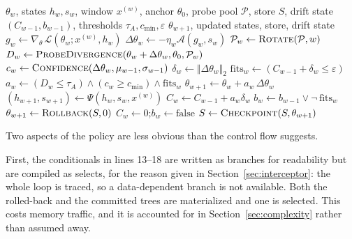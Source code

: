 \documentclass[journal]{IEEEtran}
\newcommand{\fast}{\theta}
\newcommand{\anchorp}{\theta_{0}}
\newcommand{\dtheta}{\Delta\theta}
\newcommand{\budget}{\varepsilon}
\begin{document}
\begin{algorithm}[!t]
\caption{Trust-gated fast-weight update (one window $w$)}
\label{alg:gate}
\begin{algorithmic}[1]
\Require $\fast_w$, states $h_w, s_w$, window $x^{(w)}$, anchor $\anchorp$, probe
         pool $\mathcal{P}$, store $S$, drift state $(C_{w-1}, b_{w-1})$,
         thresholds $\tau_A, c_{\min}, \budget$
\Ensure  $\fast_{w+1}$, updated states, store, drift state
\State $g_w \gets \nabla_{\fast}\,\mathcal{L}(\fast_w; x^{(w)}, h_w)$
       \Comment{\eqref{eq:innergrad}}
\State $\dtheta_w \gets -\eta_w \mathcal{A}(g_w, s_w)$ \Comment{\eqref{eq:delta}}
\State $\mathcal{P}_w \gets \Call{Rotate}{\mathcal{P}, w}$ \Comment{\eqref{eq:rotation}}
\State $D_w \gets \Call{ProbeDivergence}{\fast_w + \dtheta_w, \anchorp, \mathcal{P}_w}$
       \Comment{\eqref{eq:divergence}}
\State $c_w \gets \Call{Confidence}{\dtheta_w, \mu_{w-1}, \sigma_{w-1}}$
       \Comment{\eqref{eq:confidence}}
\State $\delta_w \gets \Vert \dtheta_w \Vert_2$ \Comment{\eqref{eq:driftdelta}}
\State $\mathrm{fits}_w \gets (C_{w-1} + \delta_w \leq \budget)$
       \Comment{\eqref{eq:wouldbreach}}
\State $a_w \gets (D_w \leq \tau_A) \wedge (c_w \geq c_{\min}) \wedge \mathrm{fits}_w$
       \Comment{\eqref{eq:admit}}
\State $\fast_{w+1} \gets \fast_w + a_w\,\dtheta_w$
\State $(h_{w+1}, s_{w+1}) \gets \Psi(h_w, s_w, x^{(w)})$
\State $C_w \gets C_{w-1} + a_w \delta_w$ \Comment{\eqref{eq:accumulate}}
\State $b_w \gets b_{w-1} \vee \neg\,\mathrm{fits}_w$ \Comment{\eqref{eq:latch}}
    \State $\fast_{w+1} \gets \Call{Rollback}{S, 0}$ \Comment{\eqref{eq:rollback}}
    \State $C_w \gets 0$;\quad $b_w \gets \text{false}$ 
    \State {}
    \State $S \gets \Call{Checkpoint}{S, \fast_{w+1}}$ 
\EndIf
\State {}
\end{algorithmic}
\end{algorithm}

Two aspects of the policy are less obvious than the control flow suggests.

First, the conditionals in lines 13--18 are written as branches for readability but
are compiled as selects, for the reason given in Section~\ref{sec:interceptor}: the
whole loop is traced, so a data-dependent branch is not available. Both the
rolled-back and the committed trees are materialized and one is selected. This costs
memory traffic, and it is accounted for in Section~\ref{sec:complexity} rather than
assumed away.
\end{document}
